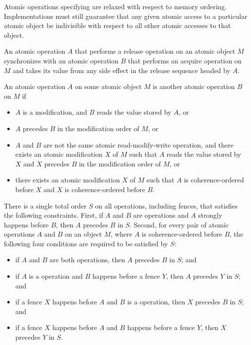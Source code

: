 \begin{note}
Atomic operations specifying  are relaxed
with respect to memory ordering. Implementations must still guarantee that any
given atomic access to a particular atomic object be indivisible with respect
to all other atomic accesses to that object.
\end{note}

\pnum
An atomic operation $A$ that performs a release operation on an atomic
object $M$ synchronizes with an atomic operation $B$ that performs
an acquire operation on $M$ and takes its value from any side effect in the
release sequence headed by $A$.

\pnum
An atomic operation $A$ on some atomic object $M$ is
another atomic operation $B$ on $M$ if
\begin{itemize}
\item $A$ is a modification, and
$B$ reads the value stored by $A$, or
\item $A$ precedes $B$
in the modification order of $M$, or
\item $A$ and $B$ are not
the same atomic read-modify-write operation, and
there exists an atomic modification $X$ of $M$
such that $A$ reads the value stored by $X$ and
$X$ precedes $B$
in the modification order of $M$, or
\item there exists an atomic modification $X$ of $M$
such that $A$ is coherence-ordered before $X$ and
$X$ is coherence-ordered before $B$.
\end{itemize}

\pnum
There is a single total order $S$
on all  operations, including fences,
that satisfies the following constraints.
First, if $A$ and $B$ are
 operations and
$A$ strongly happens before $B$,
then $A$ precedes $B$ in $S$.
Second, for every pair of atomic operations $A$ and
$B$ on an object $M$,
where $A$ is coherence-ordered before $B$,
the following four conditions are required to be satisfied by $S$:
\begin{itemize}
\item if $A$ and $B$ are both
 operations,
then $A$ precedes $B$ in $S$; and
\item if $A$ is a  operation and
$B$ happens before
a  fence $Y$,
then $A$ precedes $Y$ in $S$; and
\item if a  fence $X$
happens before $A$ and
$B$ is a  operation,
then $X$ precedes $B$ in $S$; and
\item if a  fence $X$
happens before $A$ and
$B$ happens before
a  fence $Y$,
then $X$ precedes $Y$ in $S$.
\end{itemize}


